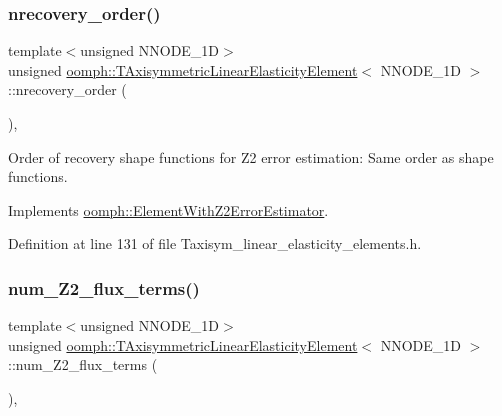 \subsubsection{\texorpdfstring{nrecovery\+\_\+order()}{nrecovery\_order()}}
{\footnotesize\ttfamily template$<$unsigned N\+N\+O\+D\+E\+\_\+1D$>$ \\
unsigned \hyperlink{classoomph_1_1TAxisymmetricLinearElasticityElement}{oomph\+::\+T\+Axisymmetric\+Linear\+Elasticity\+Element}$<$ N\+N\+O\+D\+E\+\_\+1D $>$\+::nrecovery\+\_\+order (\begin{DoxyParamCaption}{ }\end{DoxyParamCaption})\hspace{0.3cm}{\ttfamily [inline]}, {\ttfamily [virtual]}}



Order of recovery shape functions for Z2 error estimation\+: Same order as shape functions. 



Implements \hyperlink{classoomph_1_1ElementWithZ2ErrorEstimator_af39480835bd3e0f6b2f4f7a9a4044798}{oomph\+::\+Element\+With\+Z2\+Error\+Estimator}.



Definition at line 131 of file Taxisym\+\_\+linear\+\_\+elasticity\+\_\+elements.\+h.

\mbox{\label{classoomph_1_1TAxisymmetricLinearElasticityElement_a8badf4a8ed47cc64b0a728baec1c243a}} 
\subsubsection{\texorpdfstring{num\+\_\+\+Z2\+\_\+flux\+\_\+terms()}{num\_Z2\_flux\_terms()}}
{\footnotesize\ttfamily template$<$unsigned N\+N\+O\+D\+E\+\_\+1D$>$ \\
unsigned \hyperlink{classoomph_1_1TAxisymmetricLinearElasticityElement}{oomph\+::\+T\+Axisymmetric\+Linear\+Elasticity\+Element}$<$ N\+N\+O\+D\+E\+\_\+1D $>$\+::num\+\_\+\+Z2\+\_\+flux\+\_\+terms (\begin{DoxyParamCaption}{ }\end{DoxyParamCaption})\hspace{0.3cm}{\ttfamily [inline]}, {\ttfamily [virtual]}}



